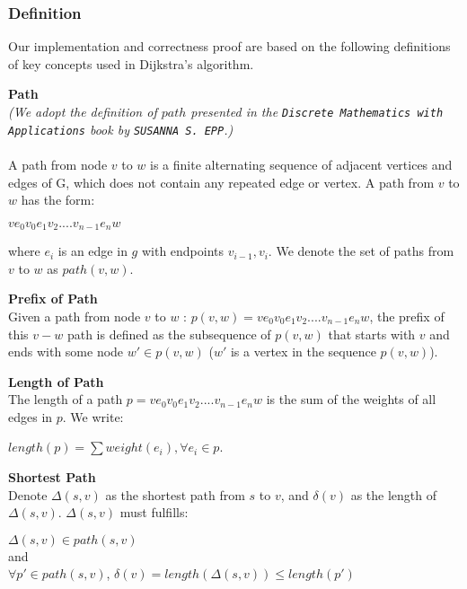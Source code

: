 
\subsubsection{Definition}
Our implementation and correctness proof are based on the following definitions of key concepts used in Dijkstra's algorithm. 
\theoremstyle{definition}
\begin{definition}\textbf{Path}\\
\textit{(We adopt the definition of $path$ presented in the \texttt{Discrete Mathematics with Applications} book by \texttt{SUSANNA S. EPP}.)}
\\\\
A path from node $v$ to $w$ is a finite alternating sequence of adjacent vertices and edges of G, which does not contain any repeated edge or vertex. A path from $v$ to $w$ has the form: 
\begin{center}
 $ve_0v_0e_1v_2....v_{n-1}e_nw$ 
\end{center}
where $e_i$ is an edge in $g$ with endpoints $v_{i-1}, v_i$. We denote the set of paths from $v$ to $w$ as $path(v, w)$.
\end{definition}
\tab
\begin{definition}\textbf{Prefix of Path}\\
Given a path from node $v$ to $w$ : $p(v, w) = ve_0v_0e_1v_2....v_{n-1}e_nw$, the prefix of this $v-w$ path is defined as the subsequence of $p(v, w)$ that starts with $v$ and ends with some node $w' \in p(v, w)$ ($w'$ is a vertex in the sequence $p(v, w)$). 
\end{definition}
\tab
\begin{definition}\textbf{Length of Path} \\
The length of a path $p = ve_0v_0e_1v_2....v_{n-1}e_nw$ is the sum of the weights of all edges in $p$. We write: 
\begin{center}
  $length(p) = \sum weight(e_i), \forall e_i \in p$. 
\end{center} 
\end{definition}
\tab
\begin{definition}\textbf{Shortest Path}\\
Denote $\Delta(s, v)$ as the shortest path from $s$ to $v$, and $\delta(v)$ as the length of $\Delta(s, v)$. $\Delta(s, v)$ must fulfills: 
\begin{center}
$\Delta(s, v) \in path(s, v)$ 
\\
and 
\\
$\forall p' \in path(s, v)$, $\delta(v) = length(\Delta(s, v)) \leq length(p')$
\end{center}
\end{definition}
